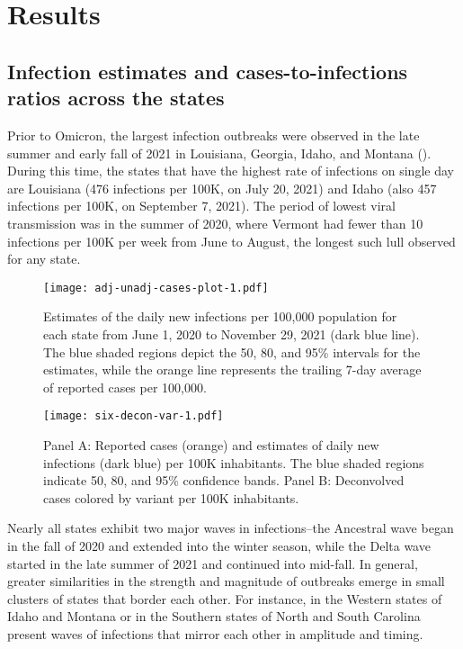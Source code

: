 \section{Results}
\label{sec:results}

\subsection{Infection estimates and cases-to-infections ratios across the \US states}
\label{sec:omitted-waves}

Prior to Omicron, the largest infection outbreaks were observed in the late 
summer and early fall of 2021 in Louisiana, Georgia, Idaho, and Montana (). 
During this time, the states that have the
highest rate of infections on single day are Louisiana (476 infections per 100K,
on July 20, 2021) and Idaho (also 457 infections per 100K, on September 7,
2021). The period of lowest viral transmission was in the summer of
2020, where Vermont had fewer than 10 infections
per 100K per week from June to August, the longest such lull observed for any state. 

\begin{figure}[!tb]
\centering
\texttt{[image: adj-unadj-cases-plot-1.pdf]} 
\caption{Estimates of the daily new infections per 100,000 population
for each \US state from June 1, 2020 to November 29, 2021 (dark blue line). The
blue shaded regions depict the 50, 80, and 95\% intervals for the estimates,
while the orange line represents the trailing 7-day average of reported cases
per 100,000.}
\label{fig:state_infect_est}
\end{figure}    

\begin{figure}[!tb]
\centering
    \texttt{[image: six-decon-var-1.pdf]}
    \caption{Panel A: Reported cases (orange) and estimates of daily new
    infections (dark blue) per 100K inhabitants. The blue shaded regions
    indicate 50, 80, and 95\% confidence bands.  
    Panel B: Deconvolved cases colored by variant per 100K inhabitants.}
    \label{fig:six-states}
\end{figure}

Nearly all states exhibit two major waves in infections--the Ancestral wave
began in the fall of 2020 and extended into the winter season, while the Delta wave
started in the late summer of 2021 and continued into mid-fall. 
In general, greater similarities in the strength and magnitude of outbreaks
emerge in small clusters of states that border each other. 
For instance, in the
Western states of Idaho and Montana or in the Southern states of North and South
Carolina present waves of infections that mirror each other in amplitude and timing.

